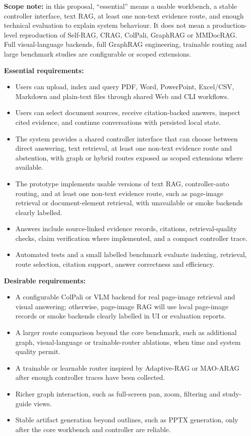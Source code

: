 \documentclass[a4paper,11pt]{article}
\begin{document}
\textbf{Scope note:} in this proposal, ``essential'' means a usable workbench, a stable controller interface, text RAG, at least one non-text evidence route, and enough technical evaluation to explain system behaviour. It does not mean a production-level reproduction of Self-RAG, CRAG, ColPali, GraphRAG or MMDocRAG. Full visual-language backends, full GraphRAG engineering, trainable routing and large benchmark studies are configurable or scoped extensions.

\textbf{Essential requirements:}
\begin{itemize}
  \item Users can upload, index and query PDF, Word, PowerPoint, Excel/CSV, Markdown and plain-text files through shared Web and CLI workflows.
  \item Users can select document sources, receive citation-backed answers, inspect cited evidence, and continue conversations with persisted local state.
  \item The system provides a shared controller interface that can choose between direct answering, text retrieval, at least one non-text evidence route and abstention, with graph or hybrid routes exposed as scoped extensions where available.
  \item The prototype implements usable versions of text RAG, controller-auto routing, and at least one non-text evidence route, such as page-image retrieval or document-element retrieval, with unavailable or smoke backends clearly labelled.
  \item Answers include source-linked evidence records, citations, retrieval-quality checks, claim verification where implemented, and a compact controller trace.
  \item Automated tests and a small labelled benchmark evaluate indexing, retrieval, route selection, citation support, answer correctness and efficiency.
\end{itemize}

\textbf{Desirable requirements:}
\begin{itemize}
  \item A configurable ColPali or VLM backend for real page-image retrieval and visual answering; otherwise, page-image RAG will use local page-image records or smoke backends clearly labelled in UI or evaluation reports.
  \item A larger route comparison beyond the core benchmark, such as additional graph, visual-language or trainable-router ablations, when time and system quality permit.
  \item A trainable or learnable router inspired by Adaptive-RAG or MAO-ARAG after enough controller traces have been collected.
  \item Richer graph interaction, such as full-screen pan, zoom, filtering and study-guide views.
  \item Stable artifact generation beyond outlines, such as PPTX generation, only after the core workbench and controller are reliable.
\end{itemize}
\end{document}
